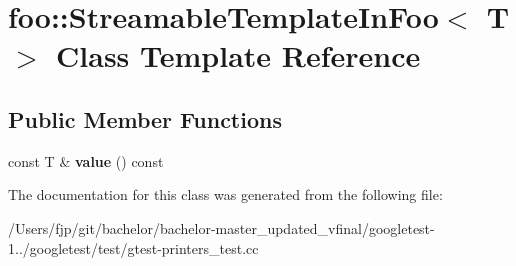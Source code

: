 \hypertarget{classfoo_1_1_streamable_template_in_foo}{}\section{foo\+:\+:Streamable\+Template\+In\+Foo$<$ T $>$ Class Template Reference}
\label{classfoo_1_1_streamable_template_in_foo}
\subsection*{Public Member Functions}
\begin{DoxyCompactItemize}
\item 
\mbox{\label{classfoo_1_1_streamable_template_in_foo_aa6e29a9a298014ce74c65423b6985023}} 
const T \& {\bfseries value} () const
\end{DoxyCompactItemize}


The documentation for this class was generated from the following file\+:\begin{DoxyCompactItemize}
\item 
/\+Users/fjp/git/bachelor/bachelor-\/master\+\_\+updated\+\_\+vfinal/googletest-\/1../googletest/test/gtest-\/printers\+\_\+test.\+cc\end{DoxyCompactItemize}
